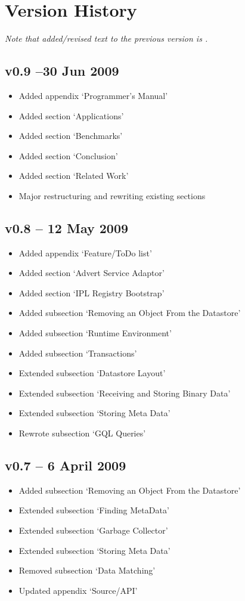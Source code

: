 \section{Version History}
\emph{Note that added/revised text to the previous version is .}

\subsection*{v0.9 --30 Jun 2009}
\begin{itemize}
  \item Added appendix `Programmer's Manual'
  \item Added section `Applications'
  \item Added section `Benchmarks'
  \item Added section `Conclusion'
  \item Added section `Related Work'
  \item Major restructuring and rewriting existing sections
\end{itemize}

\subsection*{v0.8 -- 12 May 2009}
\begin{itemize}
  \item Added appendix `Feature/ToDo list'
  \item Added section `Advert Service Adaptor'
  \item Added section `IPL Registry Bootstrap'
  \item Added subsection `Removing an Object From the Datastore'
  \item Added subsection `Runtime Environment'
  \item Added subsection `Transactions'
  \item Extended subsection `Datastore Layout'
  \item Extended subsection `Receiving and Storing Binary Data'
  \item Extended subsection `Storing Meta Data'
  \item Rewrote subsection `GQL Queries'
\end{itemize}

\subsection*{v0.7 -- 6 April 2009}
\begin{itemize}
  \item Added subsection `Removing an Object From the Datastore'
  \item Extended subsection `Finding MetaData'
  \item Extended subsection `Garbage Collector'
  \item Extended subsection `Storing Meta Data'
  \item Removed subsection `Data Matching'
  \item Updated appendix `Source/API'
\end{itemize}

